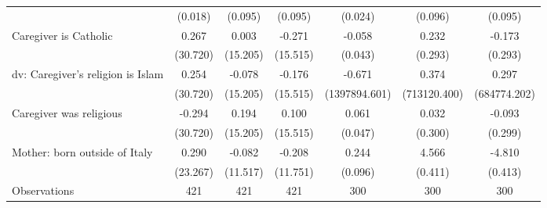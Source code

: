 {\begin{tabular}{l*{6}{c}}
                    &     (0.018)         &     (0.095)         &     (0.095)         &     (0.024)         &     (0.096)         &     (0.095)         \\
\addlinespace
Caregiver is Catholic&       0.267         &       0.003         &      -0.271         &      -0.058         &       0.232         &      -0.173         \\
                    &    (30.720)         &    (15.205)         &    (15.515)         &     (0.043)         &     (0.293)         &     (0.293)         \\
\addlinespace
dv: Caregiver's religion is Islam&       0.254         &      -0.078         &      -0.176         &      -0.671         &       0.374         &       0.297         \\
                    &    (30.720)         &    (15.205)         &    (15.515)         &(1397894.601)         &(713120.400)         &(684774.202)         \\
\addlinespace
Caregiver was religious&      -0.294         &       0.194         &       0.100         &       0.061         &       0.032         &      -0.093         \\
                    &    (30.720)         &    (15.205)         &    (15.515)         &     (0.047)         &     (0.300)         &     (0.299)         \\
\addlinespace
Mother: born outside of Italy&       0.290         &      -0.082         &      -0.208         &       0.244\sym{*}  &       4.566\sym{***}&      -4.810\sym{***}\\
                    &    (23.267)         &    (11.517)         &    (11.751)         &     (0.096)         &     (0.411)         &     (0.413)         \\
\midrule
Observations        &         421         &         421         &         421         &         300         &         300         &         300         \\
\bottomrule
\end{tabular}
}
